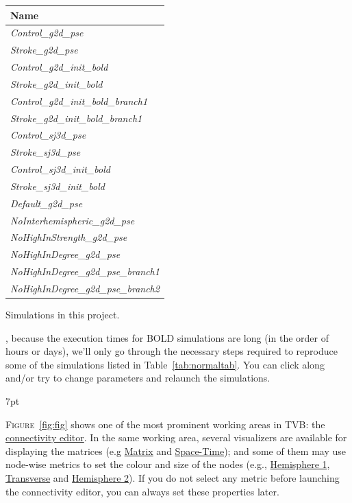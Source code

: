 \documentclass{tufte-handout}
\newenvironment{blah}{%
  \def\FrameCommand{%
    \hspace{1pt}%
    {\color{DarkOrange}\vrule width 2pt}%
    {\color{PeachPuff}\vrule width 4pt}%
    \colorbox{PeachPuff}%
  }%
  \MakeFramed{\advance\hsize-\width\FrameRestore}%
  \noindent\hspace{-4.55pt}%
  \begin{adjustwidth}{}{7pt}%
  \vspace{2pt}\vspace{2pt}%
}
{%
  \vspace{2pt}\end{adjustwidth}\endMakeFramed%
}
\begin{document}
\begin{margintable}
  \centering
  \selectfont
  \begin{tabular}{l}
    \toprule
    Name           \\
    \midrule
    \textit{Control\_g2d\_pse}           \\
    \textit{Stroke\_g2d\_pse}             \\
    \textit{Control\_g2d\_init\_bold} \\
    \textit{Stroke\_g2d\_init\_bold}        \\  
    \textit{Control\_g2d\_init\_bold\_branch1}           \\
    \textit{Stroke\_g2d\_init\_bold\_branch1} \\ 
    \textit{Control\_sj3d\_pse}\\
    \textit{Stroke\_sj3d\_pse}\\
    \textit{Control\_sj3d\_init\_bold}\\
    \textit{Stroke\_sj3d\_init\_bold}\\
    \textit{Default\_g2d\_pse}\\
    \textit{NoInterhemispheric\_g2d\_pse}\\
    \textit{NoHighInStrength\_g2d\_pse}\\
    \textit{NoHighInDegree\_g2d\_pse}\\
    \textit{NoHighInDegree\_g2d\_pse\_branch1}\\
    \textit{NoHighInDegree\_g2d\_pse\_branch2}\\   
    \bottomrule
  \end{tabular}
  \caption{Simulations in this project.}
  \label{tab:normaltab}
\end{margintable}


, because the execution times for BOLD simulations
are long (in the order of hours or days), we'll only go through the necessary
steps required to reproduce some of the simulations listed in
Table~\ref{tab:normaltab}. You can click along and/or try to change
parameters and relaunch the simulations.


\begin{blah}
\textsc{Figure}~\ref{fig:fig} shows one of the most prominent working areas in
\textsc{TVB}: the \underline{connectivity editor}. In the same working area,  several
visualizers are available for displaying the matrices (e.g \underline{Matrix} and \underline{Space-Time}); and some of them may use node-wise
metrics to set the colour and size of the nodes (e.g., \underline{Hemisphere 1}, \underline{Transverse} and \underline{Hemisphere 2}). If you do not select any
metric before launching the connectivity editor, you can always set these
properties later.
\end{blah}
\end{document}
